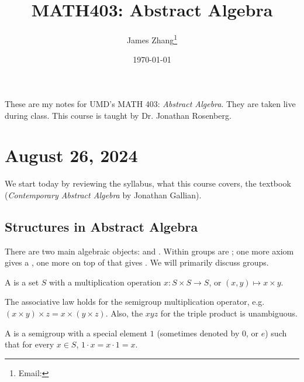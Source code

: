 \documentclass[12pt]{scrartcl}
\begin{document}
\title{MATH403: Abstract Algebra}
\author{James Zhang\thanks{Email: }}
\date{\today}



\maketitle
These are my notes for UMD's MATH 403: \textit{Abstract Algebra}. They are taken live during class. This course is taught by Dr. Jonathan Rosenberg.
\tableofcontents
\newpage

\section{August 26, 2024}
We start today by reviewing the syllabus, what this course covers, the textbook (\textit{Contemporary Abstract Algebra} by Jonathan Gallian).

\subsection{Structures in Abstract Algebra}
There are two main algebraic objects:  and . Within groups are ; one more axiom gives a , one more on top of that gives . We will primarily discuss groups.

\begin{definition}
    A  is a set $S$ with a multiplication operation $x : S \times S \to S$, or $(x, y) \mapsto x \times y$.
\end{definition}

\begin{remark}
    The associative law holds for the semigroup multiplication operator, e.g. $(x \times y) \times z = x \times (y \times z)$. Also, the $xyz$ for the triple product is unambiguous.
\end{remark}

\begin{definition}
    A  is a semigroup with a special element $1$ (sometimes denoted by $0$, or $e$) such that for every $x \in S$, $1 \cdot x = x \cdot 1 = x$.
\end{definition}
\end{document}
